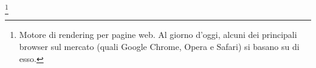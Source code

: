 \footnote{Motore di rendering per pagine web. Al giorno d'oggi, alcuni dei principali browser sul mercato (quali Google Chrome, Opera e Safari) si
basano su di esso.}
